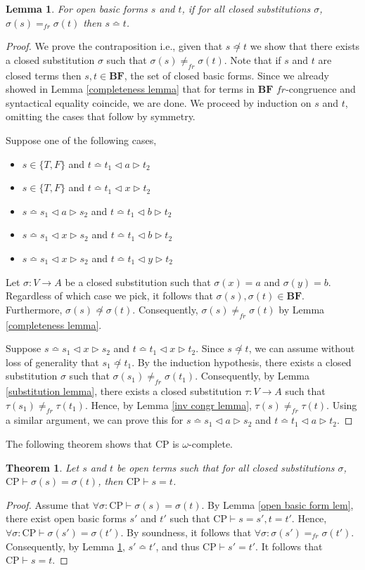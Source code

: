 \documentclass[a4paper,twoside,openright]{report}
\newcommand{\BF}{\ensuremath{\textbf{BF}}}
\newcommand{\syn}{\bumpeq}
\newcommand{\nsyn}{\not\bumpeq}
\newcommand{\CP}[1]{\ensuremath{\mathrm{CP#1}}}
\newcommand{\lef}{\ensuremath{\triangleleft}}
\newcommand{\rig}{\ensuremath{\triangleright}}
\newtheorem{lem}[theorem]{Lemma}
\newtheorem{thm}[theorem]{Theorem}
\begin{document}
\begin{lem}\label{omega lem}
For open basic forms $s$ and $t$, if for all closed substitutions $\sigma$, $\sigma(s)=_{fr}\sigma(t)$ then $s\syn t$.
\end{lem}
\begin{proof}
We prove the contraposition i.e., given that $s\nsyn t$ we show that there exists a closed substitution $\sigma$ such that $\sigma(s)\ne_{fr}\sigma(t)$. Note that if $s$ and $t$ are closed terms then $s, t\in\BF$, the set of closed basic forms. Since we already showed in Lemma \ref{completeness lemma} that for terms in \BF{} $fr$-congruence and syntactical equality coincide, we are done. We proceed by induction on $s$ and $t$, omitting the cases that follow by symmetry.

Suppose one of the following cases,
\begin{itemize}
\item $s\in\{T,F\}$ and $t\syn t_1\lef a\rig t_2$
\item $s\in\{T,F\}$ and $t\syn t_1\lef x\rig t_2$
\item $s\syn s_1\lef a\rig s_2$ and $t\syn t_1\lef b\rig t_2$
\item $s\syn s_1\lef x\rig s_2$ and $t\syn t_1\lef b\rig t_2$
\item $s\syn s_1\lef x\rig s_2$ and $t\syn t_1\lef y\rig t_2$
\end{itemize}
Let $\sigma:V\to A$ be a closed substitution such that $\sigma(x)=a$ and $\sigma(y)=b$. Regardless of which case we pick, it follows that $\sigma(s),\sigma(t)\in\BF$. Furthermore, $\sigma(s)\nsyn\sigma(t)$. Consequently, $\sigma(s)\ne_{fr}\sigma(t)$ by Lemma \ref{completeness lemma}.

Suppose $s\syn s_1\lef x\rig s_2$ and $t\syn t_1\lef x\rig t_2$. Since $s\nsyn t$, we can assume without loss of generality that $s_1\nsyn t_1$. By the induction hypothesis, there exists a closed substitution $\sigma$ such that $\sigma(s_1)\ne_{fr}\sigma(t_1)$. Consequently, by Lemma \ref{substitution lemma}, there exists a closed substitution $\tau:V\to A$ such that $\tau(s_1)\ne_{fr}\tau(t_1)$. Hence, by Lemma \ref{inv congr lemma}, $\tau(s)\ne_{fr}\tau(t)$. Using a similar argument, we can prove this for $s\syn s_1\lef a\rig s_2$ and $t\syn t_1\lef a\rig t_2$.
\end{proof}

The following theorem shows that CP is $\omega$-complete.

\begin{thm}
Let $s$ and $t$ be open terms such that for all closed substitutions $\sigma$, $\CP\vdash\sigma(s)=\sigma(t)$, then $\CP\vdash s=t$.
\end{thm}
\begin{proof}
Assume that $\forall\sigma:\CP\vdash\sigma(s)=\sigma(t)$. By Lemma \ref{open basic form lem}, there exist open basic forms $s'$ and $t'$ such that $\CP\vdash s=s',t=t'$. Hence, $\forall\sigma:\CP\vdash\sigma(s')=\sigma(t')$. By soundness, it follows that $\forall\sigma:\sigma(s')=_{fr}\sigma(t')$. Consequently, by Lemma \ref{omega lem}, $s'\syn t'$, and thus $\CP\vdash s'=t'$. It follows that $\CP\vdash s=t$.
\end{proof}
\end{document}
